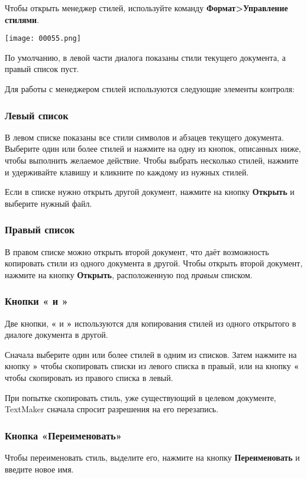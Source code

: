 \documentclass[a4paper,10pt]{article}
\begin{document}
Чтобы открыть менеджер стилей, используйте команду \textbf{Формат>Управление стилями}.

\texttt{[image: 00055.png]}

По умолчанию, в левой части диалога показаны стили текущего документа, а правый список пуст.

Для работы с менеджером стилей используются следующие элементы контроля:

\subsubsection{Левый список}
В левом списке показаны все стили символов и абзацев текущего документа. Выберите один или более стилей и нажмите на одну из кнопок, описанных ниже, чтобы выполнить желаемое действие. Чтобы выбрать несколько стилей, нажмите и удерживайте клавишу  и кликните по каждому из нужных стилей.

Если в списке нужно открыть другой документ, нажмите на кнопку \textbf{Открыть} и выберите нужный файл.

\subsubsection{Правый список}
В правом списке можно открыть второй документ, что даёт возможность копировать стили из одного документа в другой. Чтобы открыть второй документ, нажмите на кнопку \textbf{Открыть}, расположенную под \textit{правым} списком.

\subsubsection{Кнопки « и »}
Две кнопки, \textbf{«} и \textbf{»} используются для копирования стилей из одного открытого в диалоге документа в другой.

Сначала выберите один или более стилей в одним из списков. Затем нажмите на кнопку \textbf{»} чтобы скопировать списки из левого списка в правый, или на кнопку \textbf{«} чтобы скопировать  из правого списка в левый.

При попытке скопировать стиль, уже существующий в целевом документе, TextMaker сначала спросит разрешения на его перезапись.

\subsubsection{Кнопка «Переименовать»}
Чтобы переименовать стиль, выделите его, нажмите на кнопку \textbf{Переименовать} и введите новое имя.
\end{document}
